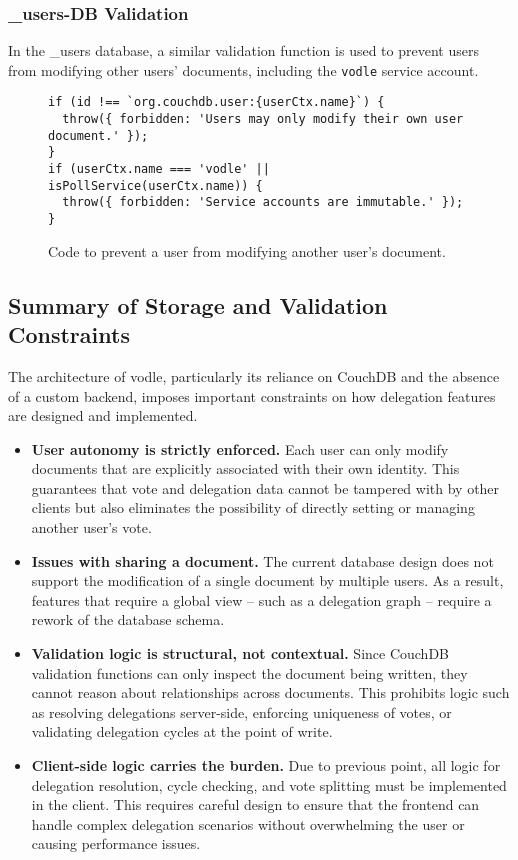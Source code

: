\subsubsection{\_users-DB Validation}
In the \_users database, a similar validation function is used to prevent users from modifying other users' documents, including the \texttt{vodle} service account.
\begin{figure}[H]
\begin{verbatim}
if (id !== `org.couchdb.user:{userCtx.name}`) {
  throw({ forbidden: 'Users may only modify their own user document.' });
}
if (userCtx.name === 'vodle' || isPollService(userCtx.name)) {
  throw({ forbidden: 'Service accounts are immutable.' });
}
\end{verbatim}
\caption{Code to prevent a user from modifying another user's document.}
\end{figure}

\subsection{Summary of Storage and Validation Constraints}
\label{subsec:summary_storage_constraints}

The architecture of vodle, particularly its reliance on CouchDB and the absence of a custom backend, imposes important constraints on how delegation features are designed and implemented.

\begin{itemize}
  \item \textbf{User autonomy is strictly enforced.} Each user can only modify documents that are explicitly associated with their own identity. This guarantees that vote and delegation data cannot be tampered with by other clients but also eliminates the possibility of directly setting or managing another user's vote.

  \item \textbf{Issues with sharing a document.} The current database design does not support the modification of a single document by multiple users. As a result, features that require a global view -- such as a delegation graph -- require a rework of the database schema.

  \item \textbf{Validation logic is structural, not contextual.} Since CouchDB validation functions can only inspect the document being written, they cannot reason about relationships across documents. This prohibits logic such as resolving delegations server-side, enforcing uniqueness of votes, or validating delegation cycles at the point of write.

  \item \textbf{Client-side logic carries the burden.} Due to previous point, all logic for delegation resolution, cycle checking, and vote splitting must be implemented in the client. This requires careful design to ensure that the frontend can handle complex delegation scenarios without overwhelming the user or causing performance issues.
\end{itemize}

